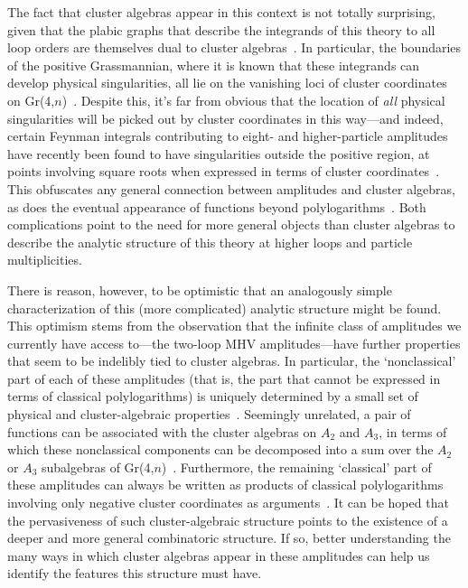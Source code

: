 \documentclass[11pt]{article}
\begin{document}
The fact that cluster algebras appear in this context is not totally surprising, given that the plabic graphs that describe the integrands of this theory to all loop orders are themselves dual to cluster algebras~\cite{ArkaniHamed:2012nw}. In particular, the boundaries of the positive Grassmannian, where it is known that these integrands can develop physical singularities, all lie on the vanishing loci of cluster coordinates on Gr(4,$n$)~\cite{ArkaniHamed:2012nw}. Despite this, it's far from obvious that the location of \emph{all} physical singularities will be picked out by cluster coordinates in this way---and indeed, certain Feynman integrals contributing to eight- and higher-particle amplitudes have recently been found to have singularities outside the positive region, at points involving square roots when expressed in terms of cluster coordinates~\cite{Prlina:2017azl,Bourjaily:2018aeq,Henn:2018cdp}. This obfuscates any general connection between amplitudes and cluster algebras, as does the eventual appearance of functions beyond polylogarithms~\cite{}. Both complications point to the need for more general objects than cluster algebras to describe the analytic structure of this theory at higher loops and particle multiplicities.

There is reason, however, to be optimistic that an analogously simple characterization of this (more complicated) analytic structure might be found. This optimism stems from the observation that the infinite class of amplitudes we currently have access to---the two-loop MHV amplitudes---have further properties that seem to be indelibly tied to cluster algebras. In particular, the `nonclassical' part of each of these amplitudes (that is, the part that cannot be expressed in terms of classical polylogarithms) is uniquely determined by a small set of physical and cluster-algebraic properties~\cite{Golden:2014pua}.  Seemingly unrelated, a pair of functions can be associated with the cluster algebras on $A_2$ and $A_3$, in terms of which these nonclassical components can be decomposed into a sum over the $A_2$ or $A_3$ subalgebras of Gr(4,$n$)~\cite{Golden:2014xqa}. Furthermore, the remaining `classical' part of these amplitudes can always be written as products of classical polylogarithms involving only negative cluster coordinates as arguments~\cite{Golden:2014xqf}. It can be hoped that the pervasiveness of such cluster-algebraic structure points to the existence of a deeper and more general combinatoric structure. If so, better understanding the many ways in which cluster algebras appear in these amplitudes can help us identify the features this structure must have.
\end{document}
